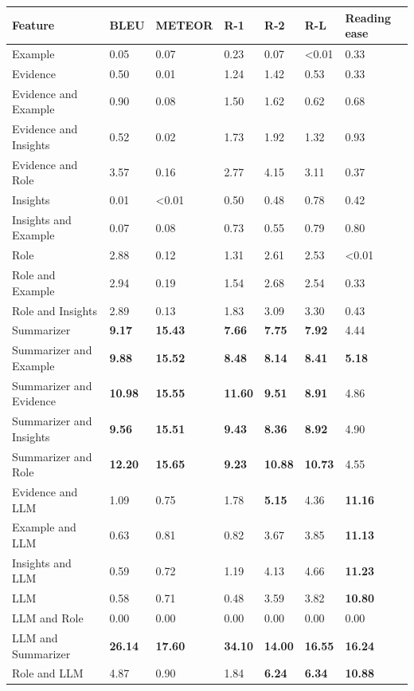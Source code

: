 \begin{tabular}{|l|l|l|l|l|l|l|}
\hline
\textbf{Feature} & BLEU & METEOR & R-1 & R-2 & R-L & Reading ease \\
 \hline
 Example & 0.05 & 0.07 & 0.23 & 0.07 & \textless{}0.01 & 0.33 \\
 \hline
 Evidence & 0.50 & 0.01 & 1.24 & 1.42 & 0.53 & 0.33 \\
 \hline
 Evidence and Example & 0.90 & 0.08 & 1.50 & 1.62 & 0.62 & 0.68 \\
 \hline
 Evidence and Insights & 0.52 & 0.02 & 1.73 & 1.92 & 1.32 & 0.93 \\
 \hline
 Evidence and Role & 3.57 & 0.16 & 2.77 & 4.15 & 3.11 & 0.37 \\
 \hline
 Insights & 0.01 & \textless{}0.01 & 0.50 & 0.48 & 0.78 & 0.42 \\
 \hline
 Insights and Example & 0.07 & 0.08 & 0.73 & 0.55 & 0.79 & 0.80 \\
 \hline
 Role & 2.88 & 0.12 & 1.31 & 2.61 & 2.53 & \textless{}0.01 \\
 \hline
 Role and Example & 2.94 & 0.19 & 1.54 & 2.68 & 2.54 & 0.33 \\
 \hline
 Role and Insights & 2.89 & 0.13 & 1.83 & 3.09 & 3.30 & 0.43 \\
 \hline
 Summarizer & \textbf{9.17} & \textbf{15.43} & \textbf{7.66} & \textbf{7.75} & \textbf{7.92} & 4.44 \\
 \hline
 Summarizer and Example & \textbf{9.88} & \textbf{15.52} & \textbf{8.48} & \textbf{8.14} & \textbf{8.41} & \textbf{5.18} \\
 \hline
 Summarizer and Evidence & \textbf{10.98} & \textbf{15.55} & \textbf{11.60} & \textbf{9.51} & \textbf{8.91} & 4.86 \\
 \hline
 Summarizer and Insights & \textbf{9.56} & \textbf{15.51} & \textbf{9.43} & \textbf{8.36} & \textbf{8.92} & 4.90 \\
 \hline
 Summarizer and Role & \textbf{12.20} & \textbf{15.65} & \textbf{9.23} & \textbf{10.88} & \textbf{10.73} & 4.55 \\
 \hline
 Evidence and LLM & 1.09 & 0.75 & 1.78 & \textbf{5.15} & 4.36 & \textbf{11.16} \\
 \hline
 Example and LLM & 0.63 & 0.81 & 0.82 & 3.67 & 3.85 & \textbf{11.13} \\
 \hline
 Insights and LLM & 0.59 & 0.72 & 1.19 & 4.13 & 4.66 & \textbf{11.23} \\
 \hline
 LLM & 0.58 & 0.71 & 0.48 & 3.59 & 3.82 & \textbf{10.80} \\
 \hline
 LLM and Role & 0.00 & 0.00 & 0.00 & 0.00 & 0.00 & 0.00 \\
 \hline
 LLM and Summarizer & \textbf{26.14} & \textbf{17.60} & \textbf{34.10} & \textbf{14.00} & \textbf{16.55} & \textbf{16.24} \\
 \hline
 Role and LLM & 4.87 & 0.90 & 1.84 & \textbf{6.24} & \textbf{6.34} & \textbf{10.88} \\
\hline
\end{tabular}
